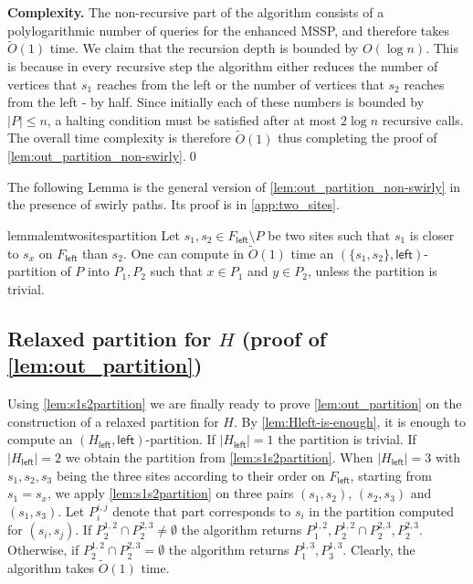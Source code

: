 \documentclass{article}
\newcommand{\leftside}{\mathsf{left}}
\newcommand{\Otild}{\tilde{O}}
\begin{document}
\medskip
\noindent
{\bf Complexity.}
The non-recursive part of the algorithm consists of a polylogarithmic number of queries for the enhanced MSSP, and therefore takes $\Otild(1)$ time.
We claim that the recursion depth is bounded by $O(\log n)$.
This is because in every recursive step the algorithm either reduces the number of vertices that $s_1$ reaches from the left or the number of vertices that $s_2$ reaches from the left - by half.
Since initially each of these numbers is bounded by $|P| \le n$, a halting condition must be satisfied after at most $2 \log n$ recursive calls.
The overall time complexity is therefore $\Otild(1)$ thus completing the proof of \cref{lem:out_partition_non-swirly}.\qed


\medskip
The following Lemma is the general version of \cref{lem:out_partition_non-swirly} in the presence of swirly paths. Its proof is in \cref{app:two_sites}.


\begin{restatable}{lemma}{lemtwositespartition} \label{lem:s1s2partition}
Let $s_1,s_2\in F_{\leftside}\setminus P$ be two sites such that $s_1$ is closer to $s_x$ on $F_{\leftside}$ than $s_2$.
One can compute in $\Otild(1)$ time an $(\{s_1,s_2\},\leftside)$-partition of $P$ into $P_1,P_2$ such that $x\in  P_1$ and $y\in P_2$, unless the partition is trivial.
\end{restatable}


\subsection{Relaxed partition for $H$ (proof of \cref{lem:out_partition})}\label{sec:H-partition}


Using \cref{lem:s1s2partition} we are finally ready to prove \cref{lem:out_partition} on the construction of a relaxed partition for $H$.
By \cref{lem:Hleft-is-enough}, it is enough to compute an $(H_{\leftside},\leftside)$-partition.
If $|H_{\leftside}|=1$ the partition is trivial. If $|H_{\leftside}|=2$ we obtain the partition from \cref{lem:s1s2partition}.
When $|H_{\leftside}|=3$ with $s_1,s_2,s_3$ being the three sites according to their order on $F_{\leftside}$, starting from $s_1 = s_x$, we apply \cref{lem:s1s2partition} on three pairs $(s_1,s_2)$, $(s_2,s_3)$ and $(s_1,s_3)$.
Let $P_i^{i,j}$ denote that part corresponds to $s_i$ in the partition computed for $(s_i,s_j)$.
If $P^{1,2}_2\cap P^{2,3}_2\ne\emptyset$ the algorithm returns $P^{1,2}_1,P^{1,2}_2\cap P^{2,3}_2,P^{2,3}_2$.
Otherwise, if $P^{1,2}_2\cap P^{2,3}_2=\emptyset$  the algorithm returns $P^{1,3}_1,P^{1,3}_3$.
Clearly, the algorithm takes $\Otild(1)$ time.
\end{document}
